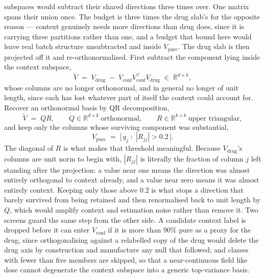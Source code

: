 subspaces would subtract their shared directions three times over. One matrix
spans their union once. The budget is three times the drug slab's for the
opposite reason --- context genuinely needs more directions than drug does,
since it is carrying three partitions rather than one, and a budget that bound
here would leave real batch structure unsubtracted and inside
$V_{\textrm{pure}}$.
The drug slab is then projected off it and re-orthonormalised. First subtract
the component lying inside the context subspace,
\begin{equation}
  \widetilde{V} \;=\; V_{\textrm{drug}} \;-\;
    V_{\textrm{conf}} V_{\textrm{conf}}^{\top} V_{\textrm{drug}}
  \;\in\; \mathbb{R}^{d \times k},
\end{equation}
whose columns are no longer orthonormal, and in general no longer of unit
length, since each has lost whatever part of itself the context could account
for. Recover an orthonormal basis by QR decomposition,
\begin{equation}
  \widetilde{V} \;=\; QR ,
  \qquad
  Q \in \mathbb{R}^{d \times k} \ \textrm{orthonormal},
  \qquad
  R \in \mathbb{R}^{k \times k} \ \textrm{upper triangular},
\end{equation}
and keep only the columns whose surviving component was substantial,
\begin{equation}
  V_{\textrm{pure}} \;=\; \big[\, q_j \;:\; |R_{jj}| > 0.2 \,\big].
\end{equation}
The diagonal of $R$ is what makes that threshold meaningful. Because
$V_{\textrm{drug}}$'s columns are unit norm to begin with, $|R_{jj}|$ is
literally the fraction of column $j$ left standing after the projection: a
value near one means the direction was almost entirely orthogonal to context
already, and a value near zero means it was almost entirely context. Keeping
only those above $0.2$ is what stops a direction that barely survived from
being retained and then renormalised back to unit length by $Q$, which would
amplify context and estimation noise rather than remove it. Two screens guard the same step from the other side. A
candidate context label is dropped before it can enter $V_{\textrm{conf}}$ if
it is more than $90\%$ pure as a proxy for the drug, since orthogonalising
against a relabelled copy of the drug would delete the drug axis by
construction and manufacture any null that followed; and classes with fewer
than five members are skipped, so that a near-continuous field like dose cannot
degenerate the context subspace into a generic top-variance basis.

